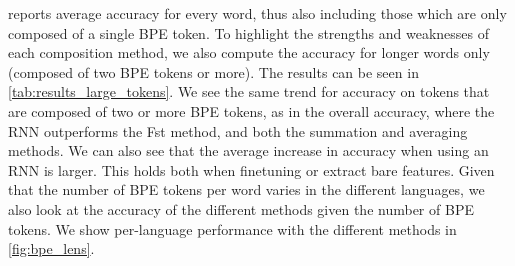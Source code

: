 \documentclass[11pt]{article}
\begin{document}
         reports average accuracy for every word,
    thus also including those which are only composed of a single BPE
    token. To highlight the strengths and weaknesses of each
    composition method, we also compute the accuracy for longer words only 
    (composed of two BPE tokens or more). The results can be seen in
    \cref{tab:results_large_tokens}.
            We see the same trend for accuracy on tokens that are
     composed of two or more BPE tokens, as in the overall accuracy,
     where the RNN outperforms the Fst method, and both the summation and averaging methods. We
     can also see that the average increase in accuracy when using an
     RNN is larger. This holds both when finetuning or extract bare features.
        Given that the number of BPE tokens per word varies in the
     different languages, we also look at the accuracy of the
     different methods given the number of BPE tokens. We show
     per-language performance with the different methods in
     \cref{fig:bpe_lens}.
    
\end{document}
